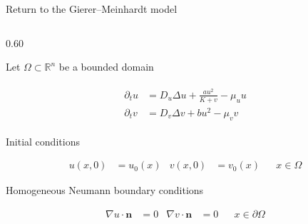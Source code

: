 

\begin{frame}{Return to the Gierer--Meinhardt model}

  \vspace{-0.38cm}

  \begin{columns}[c,onlytextwidth]

    \begin{column}{0.60\textwidth}

      {\color{HydraWhite}\fontsize{8.4}{10.3}\selectfont
        Let $\Omega\subset\mathbb R^n$ be a bounded domain
      \par}

      \vspace{-0.28cm}

      {\color{HydraWhite}\fontsize{9.7}{12.3}\selectfont
      \begin{align*}
        \begin{aligned}
          \partial_tu
          &=
          D_u\Delta u+\frac{au^2}{K+v}-\mu_u u
          \\
          \partial_tv
          &=
          D_v\Delta v+bu^2-\mu_v v
        \end{aligned}
      \end{align*}
      }

      \vspace{-0.42cm}

      {\color{HydraWhite}\fontsize{8.4}{10.3}\selectfont
        Initial conditions
      \par}

      \vspace{-0.50cm}

      {\color{HydraWhite}\fontsize{8.9}{11.3}\selectfont
      \begin{align*}
        u(x,0)&=u_0(x)
        &
        v(x,0)&=v_0(x)
        &&x\in\Omega
      \end{align*}
      }

      \vspace{-0.46cm}

      {\color{HydraWhite}\fontsize{8.4}{10.3}\selectfont
        Homogeneous Neumann boundary conditions
      \par}

      \vspace{-0.50cm}

      {\color{HydraWhite}\fontsize{8.9}{11.3}\selectfont
      \begin{align*}
        \nabla u\cdot\mathbf n
        &=0
        &
        \nabla v\cdot\mathbf n
        &=0
        &&x\in\partial\Omega
      \end{align*}
      }


\end{column}
\end{columns}
\end{frame}
